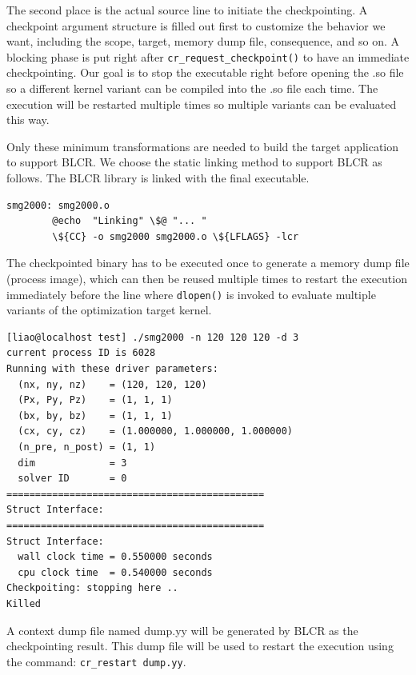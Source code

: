 The second place is the actual source line to initiate the checkpointing. 
A checkpoint argument structure is filled out first to customize the
behavior we want, including the scope, target, memory dump file,
consequence, and so on. A blocking phase is put right after
\lstinline{cr_request_checkpoint()} to have an immediate checkpointing.
Our goal is to stop the executable right before opening the .so file so
a different kernel variant can be compiled into the .so file each time. 
The execution will be restarted multiple times so multiple variants can 
be evaluated this way. 



Only these minimum transformations are needed to build the target application to support
BLCR. We choose the static linking method to support BLCR as follows.
The BLCR library is linked with the final executable. 

{\mySmallFontSize
\begin{verbatim}
smg2000: smg2000.o
        @echo  "Linking" \$@ "... "
        \${CC} -o smg2000 smg2000.o \${LFLAGS} -lcr
\end{verbatim}
}

The checkpointed binary has to be executed once to generate a memory dump
file (process image), which can then be reused multiple times to restart the execution 
immediately before the line where \lstinline{dlopen()} is invoked to evaluate multiple
variants of the optimization target kernel.

{\mySmallFontSize
\begin{verbatim}
[liao@localhost test] ./smg2000 -n 120 120 120 -d 3
current process ID is 6028
Running with these driver parameters:
  (nx, ny, nz)    = (120, 120, 120)
  (Px, Py, Pz)    = (1, 1, 1)
  (bx, by, bz)    = (1, 1, 1)
  (cx, cy, cz)    = (1.000000, 1.000000, 1.000000)
  (n_pre, n_post) = (1, 1)
  dim             = 3
  solver ID       = 0
=============================================
Struct Interface:
=============================================
Struct Interface:
  wall clock time = 0.550000 seconds
  cpu clock time  = 0.540000 seconds
Checkpoiting: stopping here ..
Killed
\end{verbatim}
}

A context dump file named dump.yy will be generated by BLCR as the
checkpointing result. This dump file will be used to restart the execution using
the command: \lstinline{cr_restart dump.yy}.
